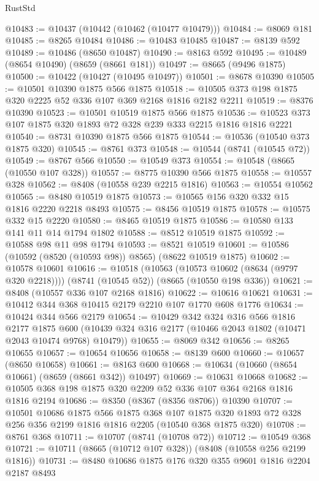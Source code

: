 \begin{lexlean}{RustStd}
\begin{coremodule}
@10483 := @10437 (@10442 (@10462 (@10477 @10479)))
@10484 := @8069 @181
@10485 := @8265 @10484
@10486 := @10483 @10485
@10487 := @8139 @592
@10489 := @10486 (@8650 @10487)
@10490 := @8163 @592
@10495 := @10489 (@8654 @10490) (@8659 (@8661 @181))
@10497 := @8665 (@9496 @1875)
@10500 := @10422 (@10427 (@10495 @10497))
@10501 := @8678 @10390
@10505 := @10501 @10390 @1875 @566 @1875
@10518 := @10505 @373 @198 @1875 @320 @2225 @52 @336 @107 @369 @2168 @1816 @2182 @2211
@10519 := @8376 @10390
@10523 := @10501 @10519 @1875 @566 @1875
@10536 := @10523 @373 @107 @1875 @320 @1893 @72 @328 @239 @333 @2215 @1816 @1816 @2221
@10540 := @8731 @10390 @1875 @566 @1875
@10544 := @10536 (@10540 @373 @1875 @320)
@10545 := @8761 @373
@10548 := @10544 (@8741 (@10545 @72))
@10549 := @8767 @566
@10550 := @10549 @373
@10554 := @10548 (@8665 (@10550 @107 @328))
@10557 := @8775 @10390 @566 @1875
@10558 := @10557 @328
@10562 := @8408 (@10558 @239 @2215 @1816)
@10563 := @10554 @10562
@10565 := @8480 @10519 @1875
@10573 := @10565 @156 @320 @332 @15 @1816 @2220 @2218 @8493
@10575 := @8456 @10519 @1875
@10578 := @10575 @332 @15 @2220
@10580 := @8465 @10519 @1875
@10586 := @10580 @133 @141 @11 @14 @1794 @1802
@10588 := @8512 @10519 @1875
@10592 := @10588 @98 @11 @98 @1794
@10593 := @8521 @10519
@10601 := @10586 (@10592 (@8520 (@10593 @98)) @8565) (@8622 @10519 @1875)
@10602 := @10578 @10601
@10616 := @10518
    (@10563 (@10573 @10602 (@8634 (@9797 @320 @2218))))
    (@8741 (@10545 @52))
    (@8665 (@10550 @198 @336))
@10621 := @8408 (@10557 @336 @107 @2168 @1816)
@10622 := @10616 @10621
@10631 := @10412 @344 @368 @10415 @2179 @2210 @107 @1770 @608 @1776
@10634 := @10424 @344 @566 @2179
@10654 := @10429
    @342
    @324
    @316
    @566
    @1816
    @2177
    @1875
    @600
    (@10439 @324 @316 @2177 (@10466 @2043 @1802 (@10471 @2043 @10474 @9768) @10479))
@10655 := @8069 @342
@10656 := @8265 @10655
@10657 := @10654 @10656
@10658 := @8139 @600
@10660 := @10657 (@8650 @10658)
@10661 := @8163 @600
@10668 := @10634 (@10660 (@8654 @10661) (@8659 (@8661 @342)) @10497)
@10669 := @10631 @10668
@10682 := @10505 @368 @198 @1875 @320 @2209 @52 @336 @107 @364 @2168 @1816 @1816 @2194
@10686 := @8350 (@8367 (@8356 @8706)) @10390
@10707 := @10501
    @10686
    @1875
    @566
    @1875
    @368
    @107
    @1875
    @320
    @1893
    @72
    @328
    @256
    @356
    @2199
    @1816
    @1816
    @2205
    (@10540 @368 @1875 @320)
@10708 := @8761 @368
@10711 := @10707 (@8741 (@10708 @72))
@10712 := @10549 @368
@10721 := @10711 (@8665 (@10712 @107 @328)) (@8408 (@10558 @256 @2199 @1816))
@10731 := @8480 @10686 @1875 @176 @320 @355 @9601 @1816 @2204 @2187 @8493

\end{coremodule}
\end{lexlean}
